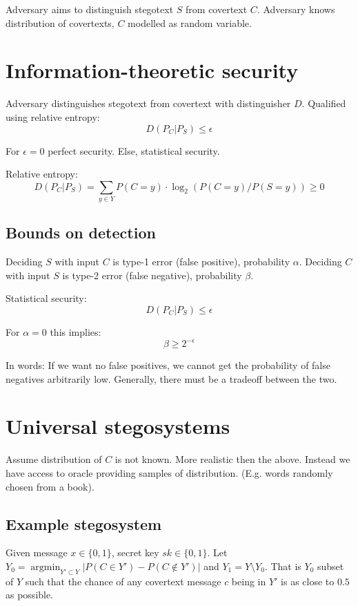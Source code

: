 \documentclass[a4paper]{scrreprt}
\begin{document}
Adversary aims to distinguish stegotext $S$ from covertext $C$. Adversary knows
distribution of covertexts, $C$ modelled as random variable.

\section{Information-theoretic security}

Adversary distinguishes stegotext from covertext with distinguisher $D$.
Qualified using relative entropy:
\[
		D(P_C | P_S) \leq \epsilon
\]

For $\epsilon = 0$ perfect security. Else, statistical security.

Relative entropy:
\[
		D(P_C | P_S) = \sum_{y \in Y} P(C = y) \cdot \log_2(P(C = y) / P(S = y)) \geq 0
\]

\subsection{Bounds on detection}

Deciding $S$ with input $C$ is type-1 error (false positive), probability
$\alpha$. Deciding $C$ with input $S$ is type-2 error (false negative),
probability $\beta$.

Statistical security:
\[
		D(P_C | P_S) \leq \epsilon
\]

For $\alpha = 0$ this implies:
\[
		\beta \geq 2^{-\epsilon}
\]

In words: If we want no false positives, we cannot get the probability of false
negatives arbitrarily low. Generally, there must be a tradeoff between the two.

\section{Universal stegosystems}

Assume distribution of $C$ is not known. More realistic then the above. Instead
we have access to oracle providing samples of distribution. (E.g. words
randomly chosen from a book).

\subsection{Example stegosystem}

Given message $x \in \{0, 1\}$, secret key $sk \in \{0, 1\}$. Let $Y_0 =
\operatorname{argmin}_{Y' \subset Y} |P(C \in Y') - P(C \not\in Y')|$ and $Y_1 =
Y \setminus Y_0$. That is $Y_0$ subset of $Y$ such that the chance of any
covertext message $c$ being in $Y'$ is as close to $0.5$ as possible.
\end{document}

